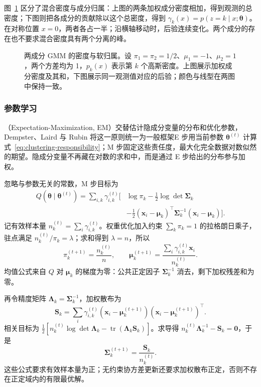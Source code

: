 图~\ref{fig:clustering-gmm-responsibilities} 区分了混合密度与成分归属：上图的两条加权成分密度相加，得到观测的总密度；下图则把各成分的贡献除以这个总密度，得到 $\gamma_k(x)=p(z=k\mid x;\bm{\theta})$。在对称位置 $x=0$，两者各占一半；沿横轴移动时，后验连续变化。两个成分的存在也不要求混合密度具有两个分离的峰。

\begin{figure}[tbp]
 \centering
 
 \caption{两成分 GMM 的密度与软归属。设 $\pi_1=\pi_2=1/2$、$\mu_1=-1$、$\mu_2=1$，两个方差均为 1，$p_k(x)$ 表示第 $k$ 个高斯密度。上图展示加权成分密度及其和，下图展示同一观测值对应的后验；颜色与线型在两图中保持一致。}
 \label{fig:clustering-gmm-responsibilities}
\end{figure}

\subsubsection{参数学习}

（Expectation-Maximization, EM）交替估计隐成分变量的分布和优化参数，Dempster、Laird 与 Rubin 将这一原则统一为一般框架E 步用当前参数 $\bm{\theta}^{(t)}$ 计算式~\eqref{eq:clustering-responsibility}；M 步固定这些责任度，最大化完全数据对数似然的期望。隐成分变量不再藏在对数的求和中，而是通过 E 步给出的分布参与加权。

忽略与参数无关的常数，M 步目标为
\begin{equation}
 \begin{aligned}
 Q(\bm{\theta}\mid\bm{\theta}^{(t)})
 =\sum_{i,k}\gamma_{i,k}^{(t)}
 \biggl[&\log\pi_k-\frac12\log\det\bm{\Sigma}_k\\
 &-\frac12(\bm{x}_i-\bm{\mu}_k)^\top
 \bm{\Sigma}_k^{-1}(\bm{x}_i-\bm{\mu}_k)\biggr].
 \end{aligned}
 \label{eq:clustering-gmm-q}
\end{equation}
记有效样本量 $n_k^{(t)}=\sum_i\gamma_{i,k}^{(t)}$。权重优化加入约束 $\sum_k\pi_k=1$ 的拉格朗日乘子，驻点满足 $n_k^{(t)}/\pi_k=\lambda$；求和得到 $\lambda=n$，所以
\begin{equation}
 \pi_k^{(t+1)}=\frac{n_k^{(t)}}{n},\qquad
 \bm{\mu}_k^{(t+1)}
 =\frac{\sum_i\gamma_{i,k}^{(t)}\bm{x}_i}{n_k^{(t)}}.
 \label{eq:clustering-gmm-mean}
\end{equation}
均值公式来自 $Q$ 对 $\bm{\mu}_k$ 的梯度为零：公共正定因子 $\bm{\Sigma}_k^{-1}$ 消去，剩下加权残差和为零。

再令精度矩阵 $\bm{\Lambda}_k=\bm{\Sigma}_k^{-1}$，加权散布为
\[
 \bm{S}_k=\sum_i\gamma_{i,k}^{(t)}
 (\bm{x}_i-\bm{\mu}_k^{(t+1)})
 (\bm{x}_i-\bm{\mu}_k^{(t+1)})^\top.
\]
相关目标为 $\tfrac12[n_k^{(t)}\log\det\bm{\Lambda}_k-\operatorname{tr}(\bm{\Lambda}_k\bm{S}_k)]$。求导得 $n_k^{(t)}\bm{\Lambda}_k^{-1}-\bm{S}_k=\bm{0}$，于是
\begin{equation}
 \bm{\Sigma}_k^{(t+1)}
 =\frac{\bm{S}_k}{n_k^{(t)}}.
 \label{eq:clustering-gmm-covariance}
\end{equation}
这些公式要求有效样本量为正；无约束协方差更新还要求加权散布正定，否则不存在正定域内的有限最优解。

